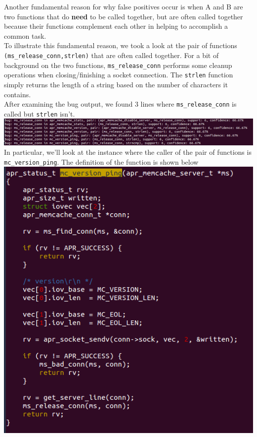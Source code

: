 \documentclass{article}
\begin{document}
Another fundamental reason for why false positives occur is when A and B are two functions that do \textbf{need} to be called together, but are often called together because their functions complement each other in helping to accomplish a common task. \\
To illustrate this fundamental reason, we took a look at the pair of functions \verb|(ms_release_conn,strlen)| that are often called together. For a bit of background on the two functions, \verb|ms_release_conn| performs some cleanup operations when closing/finishing a socket connection. The \verb|strlen| function simply returns the length of a string based on the number of characters it contains. \\
After examining the bug output, we found 3 lines where \verb|ms_release_conn| is called but \verb|strlen| isn't. \\
\includegraphics[scale=0.5]{ss/ms_release_conn_strlen_false_positives.png} \\
In particular, we'll look at the instance where the caller of the pair of functions is \verb|mc_version_ping|. The definition of the function is shown below \\
\includegraphics[scale=0.5]{ss/release_conn_no_strlen.png} \\
\end{document}

